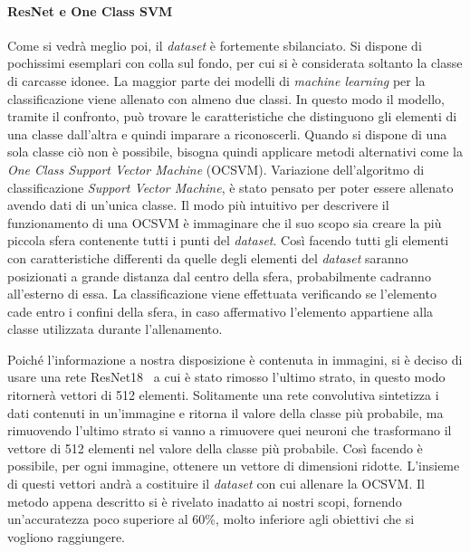 \paragraph{ResNet e One Class SVM} %
Come si vedrà meglio poi, il \textit{dataset} è fortemente sbilanciato.
Si dispone di pochissimi esemplari con colla sul fondo, per cui si è considerata soltanto la classe di carcasse idonee.
La maggior parte dei modelli di \textit{machine learning} per la classificazione viene allenato con almeno due classi.
In questo modo il modello, tramite il confronto, può trovare le caratteristiche che distinguono gli elementi di una classe dall'altra e quindi imparare a riconoscerli.
Quando si dispone di una sola classe ciò non è possibile, bisogna quindi applicare metodi alternativi come la \textit{One Class Support Vector Machine} (OCSVM).
Variazione dell'algoritmo di classificazione \textit{Support Vector Machine}, è stato pensato per poter essere allenato avendo dati di un'unica classe.
Il modo più intuitivo per descrivere il funzionamento di una OCSVM è immaginare che il suo scopo sia creare la più piccola sfera contenente tutti i punti del \textit{dataset}.
Così facendo tutti gli elementi con caratteristiche differenti da quelle degli elementi del \textit{dataset} saranno posizionati a grande distanza dal centro della sfera, probabilmente cadranno all'esterno di essa.
La classificazione viene effettuata verificando se l'elemento cade entro i confini della sfera, in caso affermativo l'elemento appartiene alla classe utilizzata durante l'allenamento.

Poiché l'informazione a nostra disposizione è contenuta in immagini, si è deciso di usare una rete ResNet18~\cite{resnet} a cui è stato rimosso l'ultimo strato, in questo modo ritornerà vettori di 512 elementi.
Solitamente una rete convolutiva sintetizza i dati contenuti in un'immagine e ritorna il valore della classe più probabile, ma rimuovendo l'ultimo strato si vanno a rimuovere quei neuroni che trasformano il vettore di 512 elementi nel valore della classe più probabile. %
Così facendo è possibile, per ogni immagine, ottenere un vettore di dimensioni ridotte.
L'insieme di questi vettori andrà a costituire il \textit{dataset} con cui allenare la OCSVM.  
Il metodo appena descritto si è rivelato inadatto ai nostri scopi, fornendo un'accuratezza poco superiore al 60\%, molto inferiore agli obiettivi che si vogliono raggiungere.

